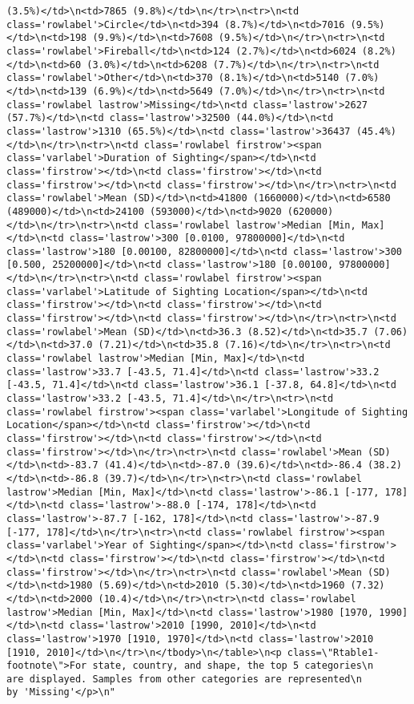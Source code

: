 \documentclass[
]{article}
\begin{document}
\begin{verbatim}
(3.5%)</td>\n<td>7865 (9.8%)</td>\n</tr>\n<tr>\n<td class='rowlabel'>Circle</td>\n<td>394 (8.7%)</td>\n<td>7016 (9.5%)</td>\n<td>198 (9.9%)</td>\n<td>7608 (9.5%)</td>\n</tr>\n<tr>\n<td class='rowlabel'>Fireball</td>\n<td>124 (2.7%)</td>\n<td>6024 (8.2%)</td>\n<td>60 (3.0%)</td>\n<td>6208 (7.7%)</td>\n</tr>\n<tr>\n<td class='rowlabel'>Other</td>\n<td>370 (8.1%)</td>\n<td>5140 (7.0%)</td>\n<td>139 (6.9%)</td>\n<td>5649 (7.0%)</td>\n</tr>\n<tr>\n<td class='rowlabel lastrow'>Missing</td>\n<td class='lastrow'>2627 (57.7%)</td>\n<td class='lastrow'>32500 (44.0%)</td>\n<td class='lastrow'>1310 (65.5%)</td>\n<td class='lastrow'>36437 (45.4%)</td>\n</tr>\n<tr>\n<td class='rowlabel firstrow'><span class='varlabel'>Duration of Sighting</span></td>\n<td class='firstrow'></td>\n<td class='firstrow'></td>\n<td class='firstrow'></td>\n<td class='firstrow'></td>\n</tr>\n<tr>\n<td class='rowlabel'>Mean (SD)</td>\n<td>41800 (1660000)</td>\n<td>6580 (489000)</td>\n<td>24100 (593000)</td>\n<td>9020 (620000)</td>\n</tr>\n<tr>\n<td class='rowlabel lastrow'>Median [Min, Max]</td>\n<td class='lastrow'>300 [0.0100, 97800000]</td>\n<td class='lastrow'>180 [0.00100, 82800000]</td>\n<td class='lastrow'>300 [0.500, 25200000]</td>\n<td class='lastrow'>180 [0.00100, 97800000]</td>\n</tr>\n<tr>\n<td class='rowlabel firstrow'><span class='varlabel'>Latitude of Sighting Location</span></td>\n<td class='firstrow'></td>\n<td class='firstrow'></td>\n<td class='firstrow'></td>\n<td class='firstrow'></td>\n</tr>\n<tr>\n<td class='rowlabel'>Mean (SD)</td>\n<td>36.3 (8.52)</td>\n<td>35.7 (7.06)</td>\n<td>37.0 (7.21)</td>\n<td>35.8 (7.16)</td>\n</tr>\n<tr>\n<td class='rowlabel lastrow'>Median [Min, Max]</td>\n<td class='lastrow'>33.7 [-43.5, 71.4]</td>\n<td class='lastrow'>33.2 [-43.5, 71.4]</td>\n<td class='lastrow'>36.1 [-37.8, 64.8]</td>\n<td class='lastrow'>33.2 [-43.5, 71.4]</td>\n</tr>\n<tr>\n<td class='rowlabel firstrow'><span class='varlabel'>Longitude of Sighting Location</span></td>\n<td class='firstrow'></td>\n<td class='firstrow'></td>\n<td class='firstrow'></td>\n<td class='firstrow'></td>\n</tr>\n<tr>\n<td class='rowlabel'>Mean (SD)</td>\n<td>-83.7 (41.4)</td>\n<td>-87.0 (39.6)</td>\n<td>-86.4 (38.2)</td>\n<td>-86.8 (39.7)</td>\n</tr>\n<tr>\n<td class='rowlabel lastrow'>Median [Min, Max]</td>\n<td class='lastrow'>-86.1 [-177, 178]</td>\n<td class='lastrow'>-88.0 [-174, 178]</td>\n<td class='lastrow'>-87.7 [-162, 178]</td>\n<td class='lastrow'>-87.9 [-177, 178]</td>\n</tr>\n<tr>\n<td class='rowlabel firstrow'><span class='varlabel'>Year of Sighting</span></td>\n<td class='firstrow'></td>\n<td class='firstrow'></td>\n<td class='firstrow'></td>\n<td class='firstrow'></td>\n</tr>\n<tr>\n<td class='rowlabel'>Mean (SD)</td>\n<td>1980 (5.69)</td>\n<td>2010 (5.30)</td>\n<td>1960 (7.32)</td>\n<td>2000 (10.4)</td>\n</tr>\n<tr>\n<td class='rowlabel lastrow'>Median [Min, Max]</td>\n<td class='lastrow'>1980 [1970, 1990]</td>\n<td class='lastrow'>2010 [1990, 2010]</td>\n<td class='lastrow'>1970 [1910, 1970]</td>\n<td class='lastrow'>2010 [1910, 2010]</td>\n</tr>\n</tbody>\n</table>\n<p class=\"Rtable1-footnote\">For state, country, and shape, the top 5 categories\n       are displayed. Samples from other categories are represented\n       by 'Missing'</p>\n"
\end{verbatim}
\end{document}
